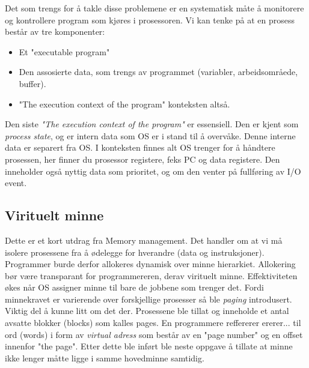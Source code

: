 Det som trengs for å takle disse problemene er en systematisk måte å monitorere og kontrollere program som kjøres i prosessoren. Vi kan tenke på at en prosess består av tre komponenter:
\begin{itemize}
\item Et "executable program"
\item Den assosierte data, som trengs av programmet (variabler, arbeidsområede, buffer).
\item "The execution context of the program" konteksten altså.
\end{itemize}
Den siste \emph{"The execution context of the program"} er essensiell. Den er kjent som \emph{process state}, og er intern data som OS er i stand til å overvåke. Denne interne data er separert fra OS.  
I konteksten finnes alt OS trenger for å håndtere prosessen, her finner du prosessor registere, feks PC og data registere. Den inneholder også nyttig data som prioritet, og om den venter på fullføring av I/O event.
\subsection{Virituelt minne}
Dette er et kort utdrag fra Memory management. Det handler om at vi må isolere prosessene fra å ødelegge for hverandre (data og instruksjoner). Programmer burde derfor allokeres dynamisk over minne hierarkiet. Allokering bør være transparant for programmereren, derav virituelt minne. Effektiviteten økes når OS assigner minne til bare de jobbene som trenger det. 
Fordi minnekravet er varierende over forskjellige prosesser så ble \emph{paging} introdusert. Viktig del å kunne litt om det der. Prosessene ble tillat og inneholde et antal avsatte blokker (blocks) som kalles pages. En programmere reffererer ererer... til ord (words) i form av \emph{virtual adress} som består av en "page number" og en offset innenfor "the page". Etter dette ble inført ble neste oppgave å tillate at minne ikke lenger måtte ligge i samme hovedminne samtidig.  